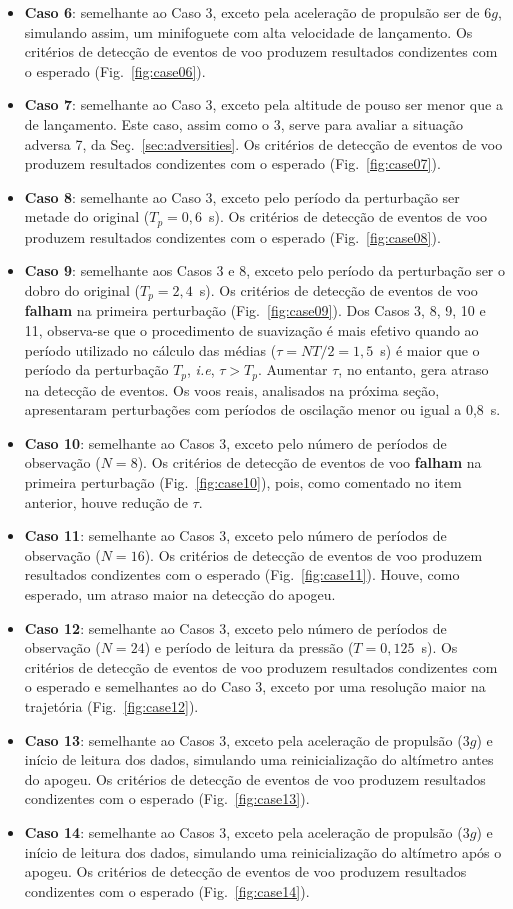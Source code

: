 \documentclass[12pt,a4paper]{article}
\begin{document}
\begin{itemize}
	\item \textbf{Caso 6}: semelhante ao Caso 3, exceto pela aceleração de propulsão ser de $6g$, simulando assim, um minifoguete com alta velocidade de lançamento.  Os critérios de detecção de eventos de voo produzem resultados condizentes com o esperado (Fig.~\ref{fig:case06}).
	\item \textbf{Caso 7}: semelhante ao Caso 3, exceto pela altitude de pouso ser menor que a de lançamento. Este caso, assim como o 3, serve para avaliar a situação adversa 7, da Seç.~\ref{sec:adversities}.  Os critérios de detecção de eventos de voo produzem resultados condizentes com o esperado (Fig.~\ref{fig:case07}).
	\item \textbf{Caso 8}: semelhante ao Caso 3, exceto pelo período da perturbação ser metade do original ($T_p=0,6$~s). Os critérios de detecção de eventos de voo produzem resultados condizentes com o esperado (Fig.~\ref{fig:case08}).
	\item \textbf{Caso 9}: semelhante aos Casos 3 e 8, exceto pelo período da perturbação ser o dobro do original ($T_p=2,4$~s). Os critérios de detecção de eventos de voo \textbf{falham} na primeira perturbação (Fig.~\ref{fig:case09}). Dos Casos 3, 8, 9, 10 e 11, observa-se que o procedimento de suavização é mais efetivo quando ao período utilizado no cálculo das médias ($\tau=NT/2=1,5$~s) é maior que o período da perturbação $T_p$, \textit{i.e}, $\tau>T_p$. Aumentar $\tau$, no entanto, gera atraso na detecção de eventos. Os voos reais, analisados na próxima seção, apresentaram perturbações com períodos de oscilação menor ou igual a 0,8~s.
	\item \textbf{Caso 10}: semelhante ao Casos 3, exceto pelo número de períodos de observação ($N=8$). Os critérios de detecção de eventos de voo \textbf{falham} na primeira perturbação (Fig.~\ref{fig:case10}), pois, como comentado no item anterior, houve redução de $\tau$. 
	\item \textbf{Caso 11}: semelhante ao Casos 3, exceto pelo número de períodos de observação ($N=16$). Os critérios de detecção de eventos de voo produzem resultados condizentes com o esperado (Fig.~\ref{fig:case11}). Houve, como esperado, um atraso maior na detecção do apogeu.
	\item \textbf{Caso 12}: semelhante ao Casos 3, exceto pelo número de períodos de observação ($N=24$) e período de leitura da pressão ($T=0,125$~s). Os critérios de detecção de eventos de voo produzem resultados condizentes com o esperado e semelhantes ao do Caso 3, exceto por uma resolução maior na trajetória (Fig.~\ref{fig:case12}).
	\item \textbf{Caso 13}: semelhante ao Casos 3, exceto pela aceleração de propulsão ($3g$) e início de leitura dos dados, simulando uma reinicialização do altímetro antes do apogeu. Os critérios de detecção de eventos de voo produzem resultados condizentes com o esperado (Fig.~\ref{fig:case13}).
	\item \textbf{Caso 14}: semelhante ao Casos 3, exceto pela aceleração de propulsão ($3g$) e início de leitura dos dados, simulando uma reinicialização do altímetro após o apogeu. Os critérios de detecção de eventos de voo produzem resultados condizentes com o esperado (Fig.~\ref{fig:case14}).
\end{itemize}
\end{document}
